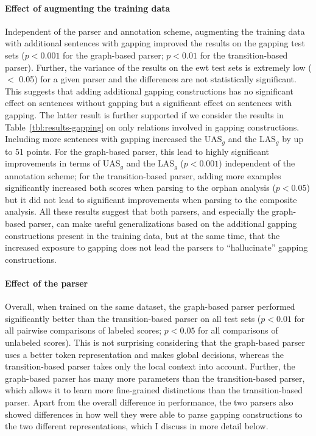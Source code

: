 \documentclass[lucida,biblatex]{sp} %
\begin{document}
\paragraph{Effect of augmenting the training data} 
Independent of the parser and annotation scheme, augmenting the training data with additional sentences with gapping improved the results on the {\sc gapping} test sets ($p<0.001$ for the graph-based parser; $p<0.01$ for the transition-based parser). Further, the variance of the results on the {\sc ewt} test sets is extremely low ($<$ 0.05) for a given parser and the differences are not statistically significant. This suggests that 
adding additional gapping constructions has no significant effect on 
sentences without gapping but a significant effect on sentences with gapping. The latter result is further supported if we consider the results in Table~\ref{tbl:results-gapping} on only relations involved in gapping constructions. Including more sentences with gapping increased the UAS$_g$ and the LAS$_g$ by up to 51 points. For the graph-based parser, this lead to highly significant improvements in terms of  UAS$_g$ and the LAS$_g$ ($p<0.001$) independent of the annotation scheme; for the transition-based parser, adding more examples significantly increased both scores when parsing to the {\sc orphan analysis} ($p<0.05$) but it did not lead to significant improvements when parsing to the {\sc composite} analysis. All these results suggest that both parsers, and especially the graph-based parser, can make useful generalizations based on the additional gapping constructions present in the training data, but at the same time, that the increased exposure to gapping does not lead the parsers to ``hallucinate'' gapping constructions.

\paragraph{Effect of the parser}

Overall, when trained on the same dataset, the graph-based parser performed significantly better than the transition-based parser on all test sets  ($p<0.01$ for all pairwise comparisons of labeled scores; $p<0.05$ for all comparisons of unlabeled scores). This is not surprising considering that the graph-based parser uses a better token representation and makes global decisions, whereas the transition-based parser takes only the local context into account. Further, the graph-based parser has many more parameters than the transition-based parser, which allows it to learn more fine-grained distinctions than the transition-based parser. Apart from the overall difference in performance, the two parsers also showed differences in how well they were able to parse gapping constructions to the two different representations, which I discuss in more detail below.
\end{document}
